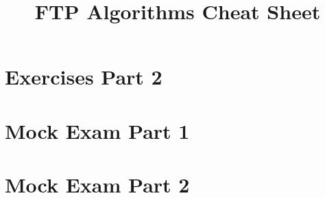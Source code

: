 \documentclass[11pt,a4paper]{article}
\title{FTP Algorithms Cheat Sheet}
\author{}
\date{}
\begin{document}
\renewcommand{\contentsname}{FTP Algorithms Cheat Sheet}
\tableofcontents
\newpage

\begin{multicols}{2}

  







\end{multicols}

\section{Exercises Part 2}
\begin{multicols}{2}

\end{multicols}

\section{Mock Exam Part 1}
\begin{multicols}{2}

\end{multicols}

\section{Mock Exam Part 2}
\begin{multicols}{2}

\end{multicols}
\end{document}
